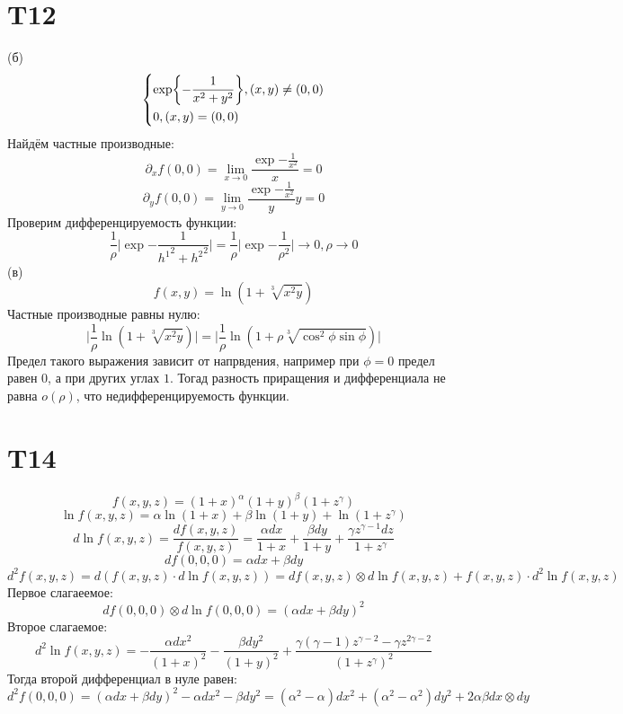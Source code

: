 \documentclass[12pt]{article}
\begin{document}
\section{T12}
(б)
\[
    \begin{dcases}
        \exp{-\frac{1}{x^{2} + y^{2}}}, (x, y) \not = (0, 0)\\
        0, (x, y) = (0, 0)\\
    \end{dcases}
\]
Найдём частные производные:
\[
    \partial_x f(0, 0) = \lim_{x \to 0}{\frac{\exp{-\frac{1}{x^2}}}{x}} = 0 
\]
\[
    \partial_y f(0, 0) = \lim_{y \to 0}{\frac{\exp{-\frac{1}{x^2}}}{y}}{y} = 0
\]
Проверим дифференцируемость функции:
\[
    \frac{1}{\rho }\vert \exp{-\frac{1}{{h^1}^{2} + {h^2}^{2}  }} \vert = \frac{1}{\rho }\vert \exp{-\frac{1}{\rho^{2} }} \vert \to 0, \rho \to 0
\]
(в)
\[
    f(x, y) = \ln(1 + \sqrt[3]{x^{2} y})
\]
Частные производные равны нулю: 
\[
    \vert \frac{1}{\rho }\ln(1 + \sqrt[3]{x^{2} y}) \vert = \vert \frac{1}{\rho }\ln(1 + \rho \sqrt[3]{\cos^{2}{\phi} \sin \phi}) \vert
\]
Предел такого выражения зависит от напрвдения, например при \(\phi = 0\) предел равен 0, а при других углах \(1\). Тогад разность приращения и дифференциала
не равна \(o(\rho )\), что недифференцируемость функции.   

\section{T14}
\[
    f(x, y, z) = (1 + x)^\alpha(1 + y)^\beta(1 + z^\gamma)
\]
\[
    \ln{f(x, y, z)} = \alpha\ln(1 + x) + \beta\ln(1 + y) + \ln(1 + z^\gamma)
\]
\[
    d \ln{f(x, y, z)} = \frac{d f(x, y, z)}{f(x, y, z)} = \frac{\alpha dx}{1 + x} + \frac{\beta dy}{1 + y} + \frac{\gamma z^{\gamma - 1}dz}{1 + z^{\gamma} }
\]
\[
    d f(0, 0, 0) = \alpha dx + \beta dy
\]
\[
    d^2 f(x, y, z) = d \left( f(x, y, z) \cdot d \ln{f(x, y, z)} \right) = d f(x, y, z) \otimes d \ln{f(x, y, z)} + f(x, y, z) \cdot d^2 \ln{f(x, y, z)} 
\]
Первое слагаеемое:
\[
    d f(0, 0, 0) \otimes d \ln{f(0, 0, 0)} = (\alpha dx + \beta dy)^{2}
\]
Второе слагаемое:
\[
    d^2 \ln{f(x, y, z)} = -\frac{\alpha dx^{2}}{(1 + x)^{2}} - \frac{\beta dy^{2}}{(1 + y)^{2}} + \frac{\gamma (\gamma - 1) z^{\gamma -2} - \gamma z^{2\gamma -2}}{(1 + z^{\gamma})^{2} }
\]
Тогда второй дифференциал в нуле равен:
\[
    d^2 f(0, 0, 0) = (\alpha dx + \beta dy)^{2} - \alpha dx^{2} - \beta dy^{2} = (\alpha^{2} - \alpha)dx^{2}  + (\alpha ^{2} -\alpha ^{2} )dy^{2} + 2\alpha \beta dx \otimes dy
\]
\end{document}

